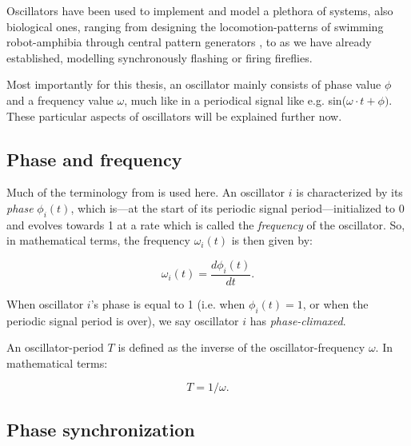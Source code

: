 


Oscillators have been used to implement and model a plethora of systems, also biological ones, ranging from designing the locomotion-patterns of swimming robot-amphibia through central pattern generators \cite{ijspeert_cpg}, to as we have already established, modelling synchronously flashing or firing fireflies.

Most importantly for this thesis, an oscillator mainly consists of phase value $\phi$ and a frequency value $\omega$, much like in a periodical signal like e.g. sin($\omega \cdot t + \phi)$. These particular aspects of oscillators will be explained further now.
	
	
	\subsection{Phase and frequency}
	Much of the terminology from \cite{nymoen_synch} is used here. An oscillator $i$ is characterized by its \textit{phase} $\phi_i(t)$, which is—at the start of its periodic signal period—initialized to 0 and evolves towards 1 at a rate which is called the \textit{frequency} of the oscillator. So, in mathematical terms, the frequency $\omega_i(t)$ is then given by:
	
	\begin{equation}
	\label{phase_freq}
		\omega_i(t) = \frac{d \phi_i(t)}{d t} .
	\end{equation}

	When oscillator $i$'s phase is equal to 1 (i.e. when $\phi_i(t)=1$, or when the periodic signal period is over), we say oscillator $i$ has \textit{phase-climaxed}.
	
	An oscillator-period $T$ is defined as the inverse of the oscillator-frequency $\omega$. In mathematical terms:
	
	\begin{equation}
	\label{period_freq}
		T = 1/\omega .
	\end{equation}
	
	
	\subsection{Phase synchronization}
	
